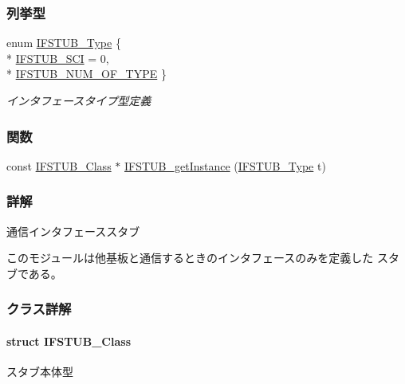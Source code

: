 \subsubsection*{列挙型}
\begin{DoxyCompactItemize}
\item 
enum \hyperlink{ifstub_8h_a2b86f96c002b1ff617cbf71481538340_a2b86f96c002b1ff617cbf71481538340}{I\+F\+S\+T\+U\+B\+\_\+\+Type} \{ \\*
\hyperlink{ifstub_8h_a2b86f96c002b1ff617cbf71481538340_a2b86f96c002b1ff617cbf71481538340a25882835bf749c565dfc3f63fc48003e}{I\+F\+S\+T\+U\+B\+\_\+\+S\+C\+I} = 0, 
\\*
\hyperlink{ifstub_8h_a2b86f96c002b1ff617cbf71481538340_a2b86f96c002b1ff617cbf71481538340aff528f210c2f81545db5aad87260ce22}{I\+F\+S\+T\+U\+B\+\_\+\+N\+U\+M\+\_\+\+O\+F\+\_\+\+T\+Y\+P\+E}
 \}\begin{DoxyCompactList}\small\item\em インタフェースタイプ型定義 \end{DoxyCompactList}
\end{DoxyCompactItemize}
\subsubsection*{関数}
\begin{DoxyCompactItemize}
\item 
const \hyperlink{ifstub_8h_da/da7/structIFSTUB__Class}{I\+F\+S\+T\+U\+B\+\_\+\+Class} $\ast$ \hyperlink{ifstub_8h_a40dd3c6220e2970e452dea86ebfee513_a40dd3c6220e2970e452dea86ebfee513}{I\+F\+S\+T\+U\+B\+\_\+get\+Instance} (\hyperlink{ifstub_8h_a2b86f96c002b1ff617cbf71481538340_a2b86f96c002b1ff617cbf71481538340}{I\+F\+S\+T\+U\+B\+\_\+\+Type} t)
\end{DoxyCompactItemize}


\subsubsection{詳解}
通信インタフェーススタブ 

このモジュールは他基板と通信するときのインタフェースのみを定義した スタブである。

 

\subsubsection{クラス詳解}
\label{structIFSTUB__Class}
\paragraph{struct I\+F\+S\+T\+U\+B\+\_\+\+Class}
スタブ本体型 

